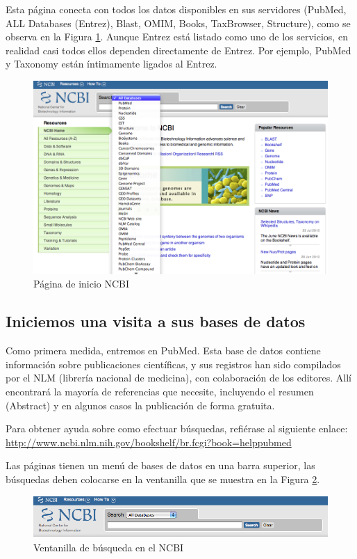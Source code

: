 \documentclass[letter,11pt]{book}
\begin{document}
Esta página conecta con todos los datos disponibles en sus servidores (PubMed, ALL Databases (Entrez), Blast, OMIM, Books, TaxBrowser, Structure), como se observa en la Figura \ref{screenshotNCBI}. Aunque Entrez está listado como uno de los servicios, en realidad casi todos ellos dependen directamente de Entrez.  Por ejemplo, PubMed y Taxonomy están íntimamente ligados al Entrez.

\begin{figure}[ht]
\centering
   \includegraphics[width=15cm]{Figs/NCBIStart.png}
  \caption{\label{screenshotNCBI}Página de inicio NCBI}
\end{figure}

\subsection{Iniciemos una visita a sus bases de datos}

Como primera medida, entremos en PubMed.  Esta base de datos contiene información sobre publicaciones científicas, y sus registros han sido compilados por el NLM (librería nacional de medicina), con colaboración de los editores. Allí encontrará la mayoría de referencias que necesite, incluyendo el resumen (Abstract) y en algunos casos la publicación de forma gratuita. 

Para obtener ayuda sobre como efectuar búsquedas, refiérase al siguiente enlace:  \url{http://www.ncbi.nlm.nih.gov/bookshelf/br.fcgi?book=helppubmed}

Las páginas tienen un menú de bases de datos en una barra superior, las búsquedas deben colocarse en la ventanilla que se muestra en la Figura \ref{screenshotsearchbox}.

\begin{figure}[ht]
\centering
   \includegraphics[width=15cm]{Figs/NCBISearchBox.png}
  \caption{\label{screenshotsearchbox}Ventanilla de búsqueda en el NCBI}
\end{figure}
 
\end{document}

